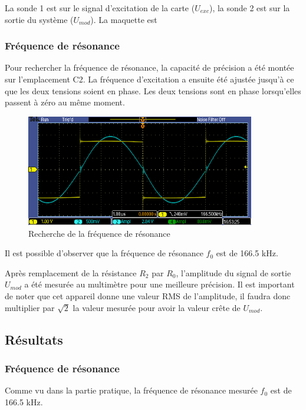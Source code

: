 La sonde 1 est sur le signal d'excitation de la carte ($U_{exc}$), la sonde 2 est sur la sortie du
système ($U_{mod}$). La maquette est 


\subsubsection{Fréquence de résonance}
Pour rechercher la fréquence de résonance, la capacité de précision a été montée sur l'emplacement C2.
 La fréquence d'excitation a ensuite été ajustée jusqu'à ce que les deux tensions soient en phase. Les deux tensions sont en
phase lorsqu'elles passent à zéro au même moment.
\begin{figure}[H]
    \centering
    \includegraphics[width=10cm]{Images/Seance2/TEK00000.PNG}
    \caption{Recherche de la fréquence de résonance}
    \label{fig:freq_oscillo}
\end{figure}

Il est possible d'observer que la fréquence de résonance $f_0$ est de 166.5 kHz.
\vspace{0,2cm}

Après remplacement de la résistance $R_2$ par $R_0$, l'amplitude du signal de sortie $U_{mod}$ 
a été mesurée au multimètre pour une meilleure précision. Il est  important de noter que cet
appareil donne une valeur RMS de l'amplitude, il faudra donc multiplier par $\sqrt{2}$ la valeur
mesurée pour avoir la valeur crête de $U_{mod}$.

\subsection{Résultats}
\subsubsection{Fréquence de résonance}

Comme vu dans la partie pratique, la fréquence de résonance mesurée $f_0$ est de 166.5 kHz.

\vspace{0,2cm}

